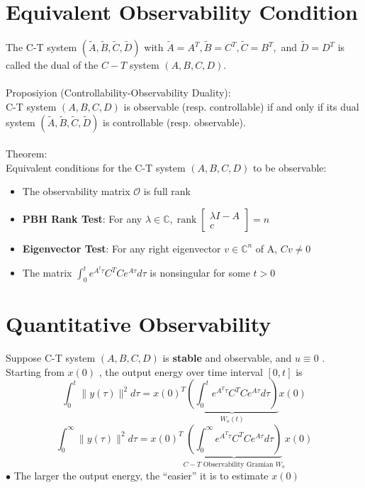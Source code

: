 \documentclass[10pt,a4paper,oneside]{article}
\begin{document}
\section{Equivalent Observability Condition}
The C-T system $(\tilde{A}, \tilde{B}, \tilde{C}, \tilde{D})$ with $\tilde{A}=A^{T}, \tilde{B}=C^{T}, \tilde{C}=B^{T},$ and
$\tilde{D}=D^{T}$ is called the dual of the $C-T$ system $(A, B, C, D)$.\\
\\
Proposiyion (Controllability-Observability Duality):\\
C-T system $(A,B,C,D)$ is observable (resp. controllable) if and only if its dual system $(\tilde{A},\tilde{B},\tilde{C},\tilde{D})$ is controllable (resp. observable).\\
\\
Theorem:\\
Equivalent conditions for the C-T system $(A,B,C,D)$ to be observable:
\begin{itemize}
\item The observability matrix $\mathcal{O}$ is full rank
\item {\bfseries PBH Rank Test}: For any $\lambda \in \mathbb{C}, \operatorname{rank}\left[\begin{array}{c}{\lambda I-A} \\ {c}\end{array}\right]=n$
\item {\bfseries Eigenvector Test}: For any right eigenvector $v\in\mathbb{C}^n$ of A, $Cv\neq0$
\item The matrix $\int_{0}^{t} e^{A^{t} \tau} C^{T} C e^{A \tau} d \tau$ is nonsingular for some $t>0$
\end{itemize}
\section{Quantitative Observability}
Suppose C-T system $(A, B, C, D)$ is {\bfseries stable} and observable, and $u \equiv 0$ .
Starting from $x(0)$ , the output energy over time interval $[0, t]$ is
\[
\int_{0}^{t}\|y(\tau)\|^{2} d \tau=x(0)^{T} \underbrace{\left(\int_{0}^{t} e^{A^{T} \tau} C^{T} C e^{A \tau} d \tau\right)}_{W_{o}(t)} x(0)
\]
\[
\int_{0}^{\infty}\|y(\tau)\|^{2} d \tau=x(0)^{T} \underbrace{\left(\int_{0}^{\infty} e^{A^{T} \tau} C^{T} C e^{A \tau} d \tau\right)}_{C-T \text { Observability Gramian } W_{o}} x(0)
\]
$\bullet$ The larger the output energy, the ``easier'' it is to estimate $x(0)$
\end{document}
